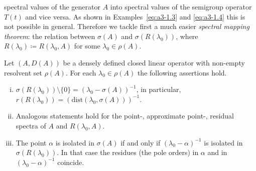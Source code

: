 spectral values of the generator $A$ into spectral values of the semigroup operator $T(t)$ and vice versa.
As shown in Examples~\ref{eq:a3-1.3} and \ref{eq:a3-1.4} this is not possible in general.
Therefore we tackle first a much easier \emph{spectral mapping theorem}: the relation between $\sigma(A)$ and $\sigma(R(\lambda_{0}))$, where $R(\lambda_{0}) \coloneqq R(\lambda_{0},A)$ for some $\lambda_{0} \in \rho(A)$.
\begin{proposition}\label{prop:a3-2.5}
Let $(A,D(A))$ be a densely defined closed linear operator with non-empty resolvent set $\rho(A)$.
For each $\lambda_{0} \in \rho(A)$ the following assertions hold.

\begin{enumerate}[(i)]
\item 
$\sigma(R(\lambda_{0})) \setminus \{0\} = (\lambda_{0} - \sigma(A))^{-1}$, in  particular, $r(R(\lambda_{0})) = (\mathrm{dist}(\lambda_{0},\sigma(A)))^{-1}$.

\item 
Analogous statements hold for the point-, approximate point-, residual spectra of $A$ and $R(\lambda_{0},A)$.

\item 
The point $\alpha$ is isolated in $\sigma(A)$ if and only if $(\lambda_{0}-\alpha)^{-1}$ is isolated in $\sigma(R(\lambda_{0}))$.
In that case the residues (\resp the pole orders) in $\alpha$ and in $(\lambda_{0}-\alpha)^{-1}$ coincide.
\end{enumerate}
\end{proposition}

